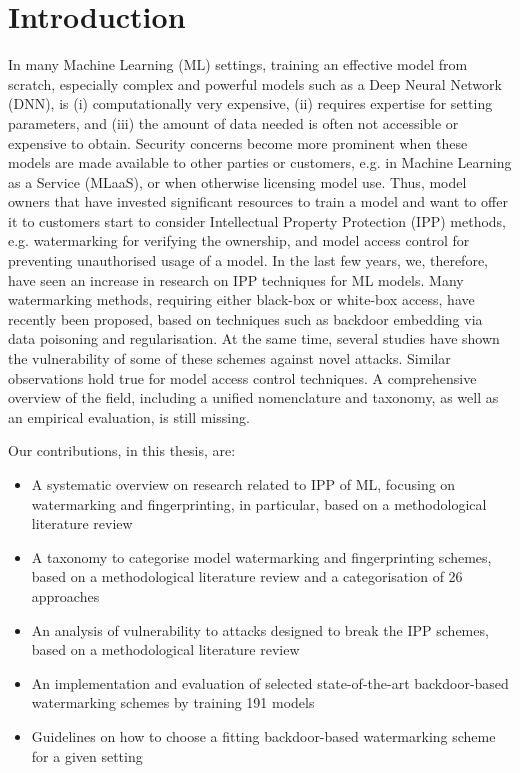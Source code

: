 \chapter{Introduction}
\label{ch:intro}

In many Machine Learning (ML) settings, training an effective model from scratch, especially complex and powerful models such as a Deep Neural Network (DNN), is (i) computationally very expensive, (ii) requires expertise for setting parameters, and (iii) the amount of data needed is often not accessible or expensive to obtain. Security concerns become more prominent when these models are made available to other parties or customers, e.g. in Machine Learning as a Service (MLaaS), or when otherwise licensing model use. Thus, model owners that have invested significant resources to train a model and want to offer it to customers start to consider Intellectual Property Protection (IPP) methods, e.g. watermarking for verifying the ownership, and model access control for preventing unauthorised usage of a model. In the last few years, we, therefore, have seen an increase in research on IPP techniques for ML models. Many watermarking methods, requiring either black-box or white-box access, have recently been proposed, based on techniques such as backdoor embedding via data poisoning and regularisation.
At the same time, several studies have shown the vulnerability of some of these schemes against novel attacks. Similar observations hold true for model access control techniques. A comprehensive overview of the field, including a unified nomenclature and taxonomy, as well as an empirical evaluation, is still missing.


Our contributions, in this thesis, are:
\begin{itemize}
    \item A systematic overview on research related to IPP of ML, focusing on watermarking and fingerprinting, in particular, based on a methodological literature review
    \item A taxonomy to categorise model watermarking and fingerprinting schemes, based on a methodological literature review and a categorisation of 26 approaches
    \item An analysis of vulnerability to attacks designed to break the IPP schemes, based on a methodological literature review
    \item An implementation and evaluation of selected state-of-the-art backdoor-based watermarking schemes by training 191 models
    \item Guidelines on how to choose a fitting backdoor-based watermarking scheme for a given setting
\end{itemize}

